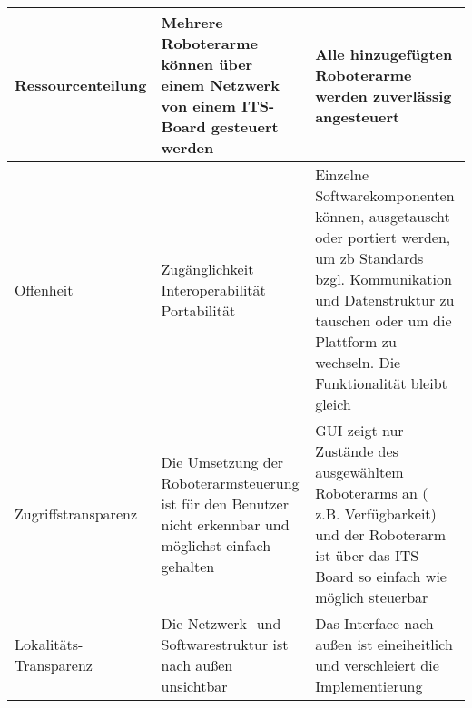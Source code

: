 \begin{longtable}{|>{\raggedright\arraybackslash}p{4cm}|>{\raggedright\arraybackslash}p{5cm}|>{\raggedright\arraybackslash}p{5cm}|}
	Ressourcenteilung  & Mehrere Roboterarme können über einem Netzwerk von einem ITS-Board gesteuert werden& Alle hinzugefügten Roboterarme werden zuverlässig angesteuert \\
	\hline
	Offenheit & 
	\parbox[t]{5cm}{Zugänglichkeit\\Interoperabilität\\Portabilität} 
	& Einzelne Softwarekomponenten können, ausgetauscht oder portiert werden, um zb Standards bzgl. Kommunikation und Datenstruktur zu tauschen oder um die Plattform zu wechseln. Die Funktionalität bleibt gleich\\
	\hline
	Zugriffstransparenz   & Die Umsetzung der Roboterarmsteuerung ist für den Benutzer nicht erkennbar und möglichst einfach gehalten & GUI zeigt nur Zustände des ausgewähltem Roboterarms an ( z.B. Verfügbarkeit) und der Roboterarm ist über das ITS-Board so einfach wie möglich steuerbar\\
	\hline
	Lokalitäts-Transparenz  & Die Netzwerk- und Softwarestruktur ist nach außen unsichtbar  & Das Interface nach außen ist eineiheitlich und verschleiert die Implementierung\\
	
	
	
\end{longtable}
\clearpage
